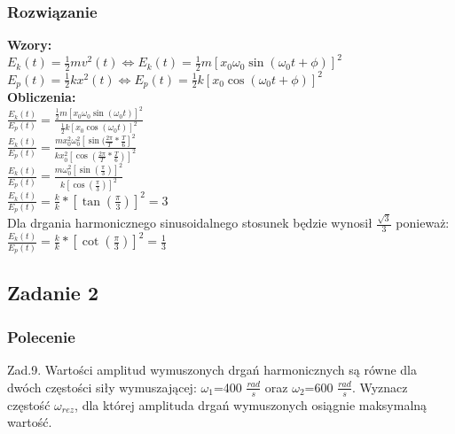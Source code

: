 \documentclass[a4paper,14pt]{extarticle}  %
\begin{document}
            \subsubsection{Rozwiązanie}
                \textbf{Wzory:}\\
                $E_k(t)=\frac{1}{2}mv^2(t)\Leftrightarrow E_k(t)=\frac{1}{2}m[x_0\omega _0\sin(\omega_0t+\phi)]^2$\\
                $E_p(t)=\frac{1}{2}kx^2(t)\Leftrightarrow E_p(t)=\frac{1}{2}k[x_0\cos(\omega_0t+\phi)]^2$\\
                \textbf{Obliczenia:}\\
                $\frac{E_k(t)}{E_p(t)}=\frac{\frac{1}{2}m[x_0\omega _0\sin(\omega_0t)]^2}{\frac{1}{2}k[x_0\cos(\omega_0t)]^2}$\\
                $\frac{E_k(t)}{E_p(t)}=\frac{mx_0^2\omega_0^2[\sin(\frac{2\pi}{T}*\frac{T}{6}]^2}{kx_0^2[\cos(\frac{2\pi}{T}*\frac{T}{6})]^2}$\\
                $\frac{E_k(t)}{E_p(t)}=\frac{m\omega _0^2[\sin(\frac{\pi}{3})]^2}{k[\cos(\frac{\pi}{3})]^2}$\\
                $\frac{E_k(t)}{E_p(t)}=\frac{k}{k}*[\tan(\frac{\pi}{3})]^2 = 3$\\
                Dla drgania harmonicznego sinusoidalnego stosunek będzie wynosił $\frac{\sqrt{3}}{3}$ ponieważ:\\
                $\frac{E_k(t)}{E_p(t)}=\frac{k}{k}*[\cot(\frac{\pi}{3})]^2 = \frac{1}{3}$\\
                \clearpage
        \subsection{Zadanie 2}
            \subsubsection{Polecenie}
                Zad.9. Wartości amplitud wymuszonych drgań harmonicznych są równe dla dwóch częstości siły wymuszającej: 
                $\omega_1$=400 $\frac{rad}{s}$ oraz $\omega_2$=600 $\frac{rad}{s}$. 
                Wyznacz częstość $\omega_{rez}$, dla której amplituda drgań wymuszonych osiągnie maksymalną wartość.
\end{document}
